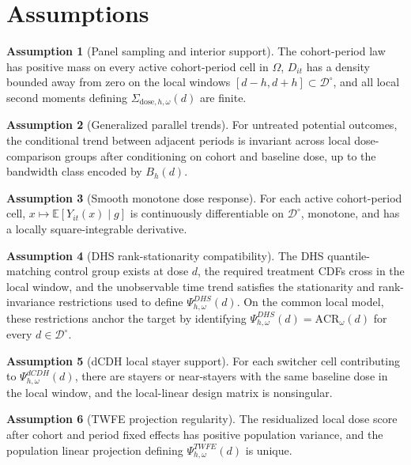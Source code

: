 \documentclass[11pt]{article}
\newcommand{\E}{\mathbb{E}}
\theoremstyle{definition}
\newtheorem{assumption}{Assumption}
\theoremstyle{plain}
\theoremstyle{remark}
\begin{document}
\section{Assumptions}
\begin{assumption}[Panel sampling and interior support]\label{ass:panel-support}
The cohort-period law has positive mass on every active cohort-period cell in \(\Omega\), \(D_{it}\) has a density bounded away from zero on the local windows \([d-h,d+h]\subset\mathcal D^\circ\), and all local second moments defining \(\Sigma_{\mathrm{dose},h,\omega}(d)\) are finite.
\end{assumption}

\begin{assumption}[Generalized parallel trends]\label{ass:gpt}
For untreated potential outcomes, the conditional trend between adjacent periods is invariant across local dose-comparison groups after conditioning on cohort and baseline dose, up to the bandwidth class encoded by \(B_h(d)\).
\end{assumption}

\begin{assumption}[Smooth monotone dose response]\label{ass:smooth-monotone}
For each active cohort-period cell, \(x\mapsto \E[Y_{it}(x)\mid g]\) is continuously differentiable on \(\mathcal D^\circ\), monotone, and has a locally square-integrable derivative.
\end{assumption}

\begin{assumption}[DHS rank-stationarity compatibility]\label{ass:dhs-rank}
The DHS quantile-matching control group exists at dose \(d\), the required treatment CDFs cross in the local window, and the unobservable time trend satisfies the stationarity and rank-invariance restrictions used to define \(\Psi^{DHS}_{h,\omega}(d)\). On the common local model, these restrictions anchor the target by identifying \(\Psi^{DHS}_{h,\omega}(d)=\mathrm{ACR}_\omega(d)\) for every \(d\in\mathcal D^\circ\).
\end{assumption}

\begin{assumption}[dCDH local stayer support]\label{ass:dcdh-stayers}
For each switcher cell contributing to \(\Psi^{dCDH}_{h,\omega}(d)\), there are stayers or near-stayers with the same baseline dose in the local window, and the local-linear design matrix is nonsingular.
\end{assumption}

\begin{assumption}[TWFE projection regularity]\label{ass:twfe-regular}
The residualized local dose score after cohort and period fixed effects has positive population variance, and the population linear projection defining \(\Psi^{TWFE}_{h,\omega}(d)\) is unique.
\end{assumption}
\end{document}
